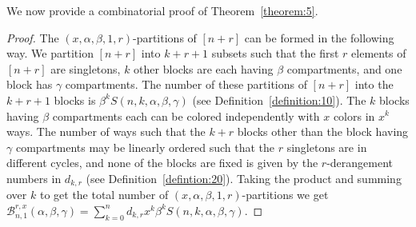 \documentclass[12pt]{amsart}
\newtheorem{proof 1}{proof 1}
\begin{document}
We now provide a combinatorial proof of Theorem~\ref{theorem:5}.

\begin{proof}The $(x,\alpha,\beta,1,r)$-partitions of $[n+r]$ can be formed in the following way. We partition $[n+r]$ into $k+r+1$ subsets such that the first $r$ elements of $[n+r]$ are singletons, $k$ other blocks are each having $\beta$ compartments, and one block has $\gamma$ compartments. The number of these partitions of $[n+r]$ into the $k+r+1$ blocks is $\beta^{k} S(n,k,\alpha,\beta,\gamma)$  (see Definition~\ref{definition:10}). The $k$ blocks having $\beta$ compartments each can be colored independently with $x$ colors in $x^k$ ways. The number of ways such that the $k+r$ blocks other than the block having $\gamma$ compartments may be linearly ordered  such that the $r$ singletons are in different cycles, and none of the blocks are fixed is given by the $r$-derangement numbers in $d_{k,r}$ (see Definition~\ref{defintion:20}). Taking the product and summing over $k$ to get the total number of $(x,\alpha,\beta,1,r)$-partitions we get $	\mathcal{B}^{r,x}_{n,1}(\alpha,\beta,\gamma)=\sum\limits_{k=0}^{n}d_{k,r}x^{k}\beta^{k} S(n,k,\alpha,\beta,\gamma)$.   
\end{proof}




\end{document}
